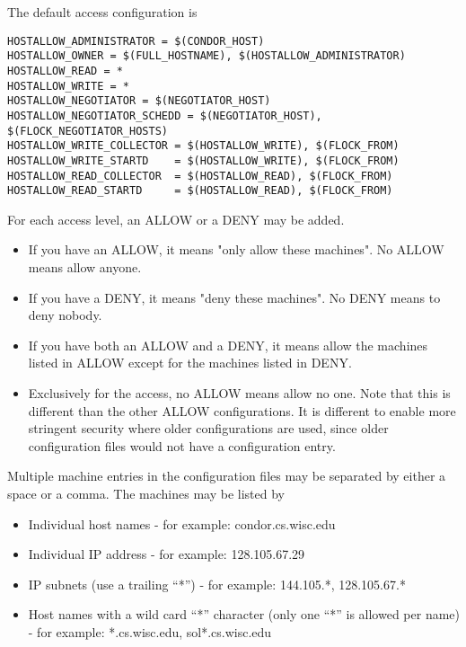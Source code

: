 The default access configuration is
\footnotesize
\begin{verbatim}
HOSTALLOW_ADMINISTRATOR = $(CONDOR_HOST)
HOSTALLOW_OWNER = $(FULL_HOSTNAME), $(HOSTALLOW_ADMINISTRATOR)
HOSTALLOW_READ = *
HOSTALLOW_WRITE = *
HOSTALLOW_NEGOTIATOR = $(NEGOTIATOR_HOST)
HOSTALLOW_NEGOTIATOR_SCHEDD = $(NEGOTIATOR_HOST), $(FLOCK_NEGOTIATOR_HOSTS)
HOSTALLOW_WRITE_COLLECTOR = $(HOSTALLOW_WRITE), $(FLOCK_FROM)
HOSTALLOW_WRITE_STARTD    = $(HOSTALLOW_WRITE), $(FLOCK_FROM)
HOSTALLOW_READ_COLLECTOR  = $(HOSTALLOW_READ), $(FLOCK_FROM)
HOSTALLOW_READ_STARTD     = $(HOSTALLOW_READ), $(FLOCK_FROM)
\end{verbatim}
\normalsize

For each access level, an ALLOW or a DENY may be added.
\begin{itemize}

\item If you have an ALLOW, it means "only allow these machines".  No
    ALLOW means allow anyone.

\item If you have a DENY, it means "deny these machines".  No DENY
    means to deny nobody.

\item If you have both an ALLOW and a DENY, it means allow the
    machines listed in ALLOW except for the machines listed in DENY.

\item Exclusively for the  access,
    no ALLOW means allow no one.
    Note that this is different than the other ALLOW configurations.
    It is different to enable more stringent security where
    older configurations are used, since
    older configuration files would not have a 
     configuration entry.
\end{itemize}

Multiple machine entries
in the configuration files
may be separated by either a space or a comma.
The machines may be listed by

\begin{itemize}
\item Individual host names - for example: condor.cs.wisc.edu
\item Individual IP address - for example: 128.105.67.29
\item IP subnets (use a trailing ``*'') - for example: 144.105.*, 128.105.67.*
\item Host names with a wild card ``*'' character (only one ``*'' is
    allowed per name) - for example: *.cs.wisc.edu, sol*.cs.wisc.edu
\end{itemize}

